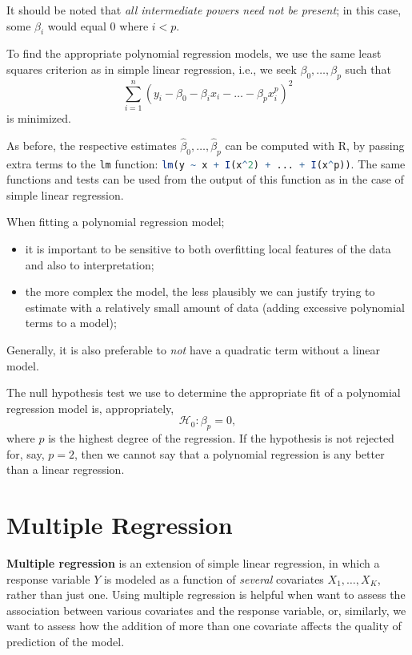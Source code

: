 \documentclass[12pt]{article}
\begin{document}
It should be noted that \textit{all intermediate powers need not be present}; in this case, some $\beta_i$ would equal 0 where $i < p$.

To find the appropriate polynomial regression models, we use the same least squares criterion as in simple linear regression, i.e., we seek \(\beta_0, \dots, \beta_p\) such that \[ \sum_{i=1}^n (y_i - \beta_0 - \beta_i x_i - \dots - \beta_p x_i^p)^2\] is minimized.

As before, the respective estimates \(\hat{\beta}_0, \dots, \hat{\beta}_p\) can be computed with R, by passing extra terms to the \lstinline[language=R]{lm} function: \lstinline[language=R]{lm(y ~ x + I(x^2) + ... + I(x^p))}. The same functions and tests can be used from the output of this function as in the case of simple linear regression. 

When fitting a polynomial regression model;
\begin{itemize}
    \item it is important to be sensitive to both overfitting local features of the data and also to interpretation;
    \item the more complex the model, the less plausibly we can justify trying to estimate with a relatively small amount of data (adding excessive polynomial terms to a model);
\end{itemize}
Generally, it is also preferable to \textit{not} have a quadratic term without a linear model. 

The null hypothesis test we use to determine the appropriate fit of a polynomial regression model is, appropriately, \[\mathcal{H}_0: \beta_p = 0,\] where $p$ is the highest degree of the regression. If the hypothesis is not rejected for, say, $p = 2$, then we cannot say that a polynomial regression is any better than a linear regression.

\section{Multiple Regression}

\textbf{Multiple regression} is an extension of simple linear regression, in which a response variable $Y$ is modeled as a function of \textit{several} covariates $X_1, \dots, X_K$, rather than just one. Using multiple regression is helpful when want to assess the association between various covariates and the response variable, or, similarly, we want to assess how the addition of more than one covariate affects the quality of prediction of the model.
\end{document}
